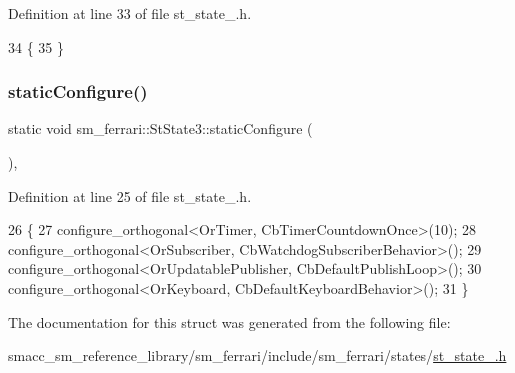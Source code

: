 Definition at line 33 of file st\+\_\+state\+\_.\+h.


\begin{DoxyCode}
34     \{
35     \}
\end{DoxyCode}
\mbox{\label{structsm__ferrari_1_1StState3_af8e946a7e28a4b5dbc43615a3e83b9db}} 
\subsubsection{\texorpdfstring{static\+Configure()}{staticConfigure()}}
{\footnotesize\ttfamily static void sm\+\_\+ferrari\+::\+St\+State3\+::static\+Configure (\begin{DoxyParamCaption}{ }\end{DoxyParamCaption})\hspace{0.3cm}{\ttfamily [inline]}, {\ttfamily [static]}}



Definition at line 25 of file st\+\_\+state\+\_.\+h.


\begin{DoxyCode}
26     \{
27         configure\_orthogonal<OrTimer, CbTimerCountdownOnce>(10);
28         configure\_orthogonal<OrSubscriber, CbWatchdogSubscriberBehavior>();
29         configure\_orthogonal<OrUpdatablePublisher, CbDefaultPublishLoop>();
30         configure\_orthogonal<OrKeyboard, CbDefaultKeyboardBehavior>();
31     \}
\end{DoxyCode}


The documentation for this struct was generated from the following file\+:\begin{DoxyCompactItemize}
\item 
smacc\+\_\+sm\+\_\+reference\+\_\+library/sm\+\_\+ferrari/include/sm\+\_\+ferrari/states/\hyperlink{sm__ferrari_2include_2sm__ferrari_2states_2st__state__3_8h}{st\+\_\+state\+\_.\+h}\end{DoxyCompactItemize}
